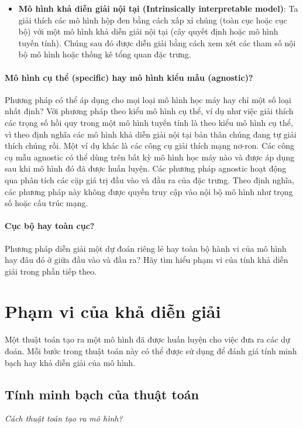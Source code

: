 \begin{itemize}
\item \textbf{Mô hình khả diễn giải nội tại (Intrinsically interpretable model)}: Ta giải thích các mô hình hộp đen bằng cách xấp xỉ chúng (toàn cục hoặc cục bộ) với một mô hình khả diễn giải nội tại (cây quyết định hoặc mô hình tuyến tính). Chúng sau đó được diễn giải bằng cách xem xét các tham số nội bộ mô hình hoặc thống kê tổng quan đặc trưng.

\end{itemize}

\paragraph{Mô hình cụ thể (specific) hay mô hình kiểu mẫu (agnostic)?} Phương pháp có thể áp dụng cho mọi loại mô hình học máy hay chỉ một số loại nhất định? Với phương pháp theo kiểu mô hình cụ thể, ví dụ như việc giải thích các trọng số hồi quy trong một mô hình tuyến tính là theo kiểu mô hình cụ thể,  vì theo định nghĩa các mô hình khả diễn giải nội tại bản thân chúng đang tự giải thích chúng rồi. Một ví dụ khác là các công cụ giải thích mạng nơ-ron. Các công cụ mẫu agnostic có thể dùng trên bất kỳ mô hình học máy nào và được áp dụng sau khi mô hình đó đã được huấn luyện. Các phương pháp agnostic hoạt động qua phân tích các cặp giá trị đầu vào và đầu ra của đặc trưng. Theo định nghĩa, các phương pháp này không được quyền truy cập vào nội bộ mô hình như trọng số hoặc cấu trúc mạng.

\paragraph{Cục bộ hay toàn cục?} Phương pháp diễn giải một dự đoán riêng lẻ hay toàn bộ hành vi của mô hình hay đâu đó ở giữa đầu vào và đầu ra? Hãy tìm hiểu phạm vi của tính khả diễn giải trong phần tiếp theo.

\clearpage 

\section{Phạm vi của khả diễn giải}
Một thuật toán tạo ra một mô hình đã được huấn luyện cho việc đưa ra các dự đoán. Mỗi bước trong thuật toán này có thể được sử dụng để đánh giá tính minh bạch hay khả diễn giải của mô hình.
\subsection{Tính minh bạch của thuật toán}
\textit{Cách thuật toán tạo ra mô hình?}

